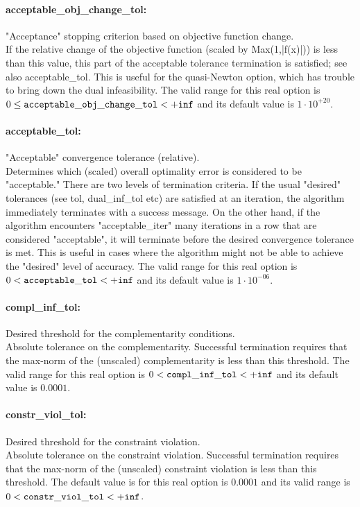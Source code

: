 \paragraph{acceptable\_obj\_change\_tol:}\label{sec:acceptable_obj_change_tol} "Acceptance" stopping criterion based on objective function change. $\;$ \\
 If the relative change of the objective function
(scaled by Max(1,|f(x)|)) is less than this
value, this part of the acceptable tolerance
termination is satisfied; see also
acceptable\_tol.  This is useful for the
quasi-Newton option, which has trouble to bring
down the dual infeasibility. The valid range for this real option is 
$0 \le {\tt acceptable\_obj\_change\_tol } <  {\tt +inf}$
and its default value is $1 \cdot 10^{+20}$.


\paragraph{acceptable\_tol:}\label{sec:acceptable_tol} "Acceptable" convergence tolerance (relative). $\;$ \\
 Determines which (scaled) overall optimality
error is considered to be "acceptable." There are
two levels of termination criteria.  If the usual
"desired" tolerances (see tol, dual\_inf\_tol
etc) are satisfied at an iteration, the algorithm
immediately terminates with a success message. 
On the other hand, if the algorithm encounters
"acceptable\_iter" many iterations in a row that
are considered "acceptable", it will terminate
before the desired convergence tolerance is met.
This is useful in cases where the algorithm might
not be able to achieve the "desired" level of
accuracy. The valid range for this real option is 
$0 <  {\tt acceptable\_tol } <  {\tt +inf}$
and its default value is $1 \cdot 10^{-06}$.


\paragraph{compl\_inf\_tol:}\label{sec:compl_inf_tol} Desired threshold for the complementarity conditions. $\;$ \\
 Absolute tolerance on the complementarity.
Successful termination requires that the max-norm
of the (unscaled) complementarity is less than
this threshold. The valid range for this real option is 
$0 <  {\tt compl\_inf\_tol } <  {\tt +inf}$
and its default value is $0.0001$.


\paragraph{constr\_viol\_tol:}\label{sec:constr_viol_tol} Desired threshold for the constraint violation. $\;$ \\
 Absolute tolerance on the constraint violation.
Successful termination requires that the max-norm
of the (unscaled) constraint violation is less
than this threshold. The default value is for this real option is $0.0001$ and its valid range is
$0 <  {\tt constr\_viol\_tol } <  {\tt +inf}$.


